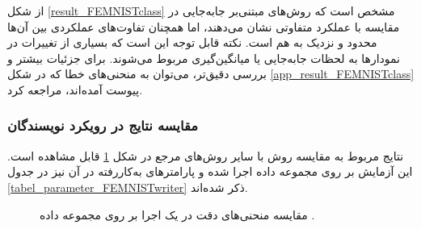 از شکل
\ref{result_FEMNISTclass}
مشخص است که روش‌های مبتنی‌بر جابه‌جایی در مقایسه با
عملکرد متفاوتی نشان می‌دهند، اما همچنان تفاوت‌های عملکردی بین آن‌ها محدود و نزدیک به هم است.
نکته قابل توجه این است که بسیاری از تغییرات در نمودارها به لحظات جابه‌جایی یا میانگین‌گیری مربوط می‌شوند.
برای جزئیات بیشتر و بررسی دقیق‌تر، می‌توان به منحنی‌های خطا که در شکل
\ref{app_result_FEMNISTclass}
پیوست آمده‌اند، مراجعه کرد.




\subsubsection{
	مقایسه نتایج در رویکرد نویسندگان
}
نتایج مربوط به مقایسه روش
با سایر روش‌های مرجع در شکل
\ref{result_FEMNISTwriter_one}
قابل مشاهده است. این آزمایش بر روی مجموعه داده
اجرا شده و پارامترهای به‌کاررفته در آن نیز در جدول
\ref{tabel_parameter_FEMNISTwriter}
ذکر شده‌اند.


\begin{figure}[t]
	\centering
	\hspace{0.8mm}
	\caption{
		مقایسه منحنی‌های دقت در یک اجرا بر روی مجموعه داده
		.
	}
	\label{result_FEMNISTwriter_one}
\end{figure}


